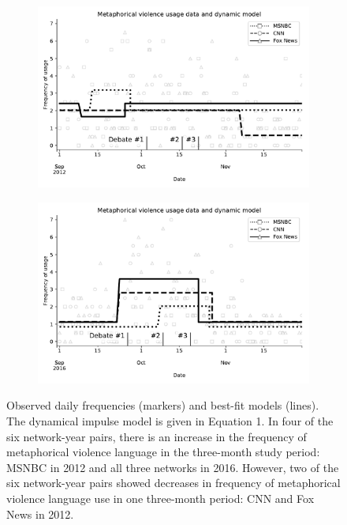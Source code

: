 %




% 

\begin{figure}[!htb]
  \centering
  \begin{subfigure}{0.8\linewidth}
    \centering
    \includegraphics[width=\textwidth]{Figures/ModelFits-2012.pdf}
   \caption{}
    \label{fig:ModelFits-2012}
  \end{subfigure}
  \begin{subfigure}{0.8\linewidth}
    \centering
    \includegraphics[width=\textwidth]{Figures/ModelFits-2016.pdf}
   \caption{}
    \label{fig:ModelFits-2016}
  \end{subfigure}

  \caption{Observed daily frequencies (markers) and best-fit models (lines).
    The dynamical impulse model is given in 
    Equation 1. In four of the six network-year pairs, 
    there is an increase in the frequency of metaphorical violence language in the
    three-month study period: MSNBC in 2012 and all three networks in 2016. 
    However, two of the six network-year pairs showed decreases in frequency
    of metaphorical violence language use in one three-month period: CNN and Fox News
    in 2012. 
  } 
  \label{fig:ModelFits}
\end{figure}


